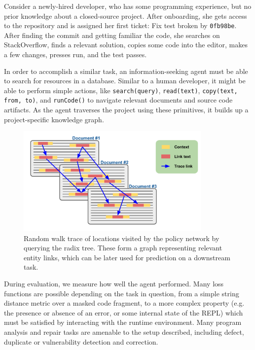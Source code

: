 \documentclass[11pt]{article}
\begin{document}
Consider a newly-hired developer, who has some programming experience, but no prior knowledge about a closed-source project. After onboarding, she gets access to the repository and is assigned her first ticket: Fix test broken by \texttt{0fb98be}. After finding the commit and getting familiar the code, she searches on StackOverflow, finds a relevant solution, copies some code into the editor, makes a few changes, presses run, and the test passes.

In order to accomplish a similar task, an information-seeking agent must be able to search for resources in a database. Similar to a human developer, it might be able to perform simple actions, like \texttt{search(query)}, \texttt{read(text)}, \texttt{copy(text, from, to)}, and \texttt{runCode()} to navigate relevant documents and source code artifacts. As the agent traverses the project using these primitives, it builds up a project-specific knowledge graph.

\begin{figure}
  \centering
  \includegraphics[width=0.85\textwidth]{use_graph}
  \caption{Random walk trace of locations visited by the policy network by querying the radix tree. These form a graph representing relevant entity links, which can be later used for prediction on a downstream task.}
\end{figure}

During evaluation, we measure how well the agent performed. Many loss functions are possible depending on the task in question, from a simple string distance metric over a masked code fragment, to a more complex property (e.g. the presence or absence of an error, or some internal state of the REPL) which must be satisfied by interacting with the runtime environment. Many program analysis and repair tasks are amenable to the setup described, including defect, duplicate or vulnerability detection and correction.
\end{document}
